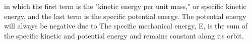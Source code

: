 \documentclass[conf]{new-aiaa}
\begin{document}
in which the first term is the "kinetic energy per unit mass," or specific kinetic energy, and the last term is the specific potential energy.  The potential energy will always be negative due to The specific mechanical energy, E, is the sum of the specific kinetic and potential energy and remains constant along its orbit.


%
%
%
%
%
%
%
%
%
%
\end{document}
